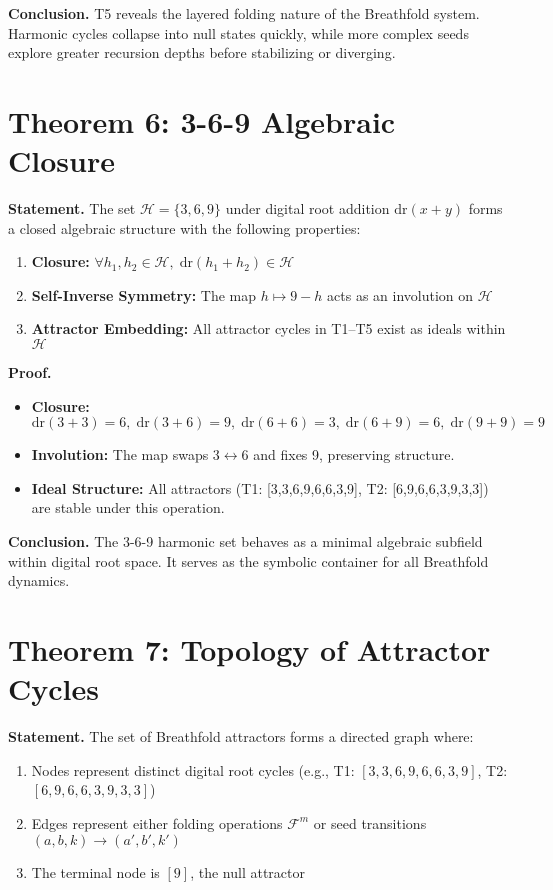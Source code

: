 \documentclass[12pt]{article}
\begin{document}
\textbf{Conclusion.} T5 reveals the layered folding nature of the Breathfold system. Harmonic cycles collapse into null states quickly, while more complex seeds explore greater recursion depths before stabilizing or diverging.

\section*{Theorem 6: 3-6-9 Algebraic Closure}
\textbf{Statement.} The set \( \mathcal{H} = \{3, 6, 9\} \) under digital root addition \( \mathrm{dr}(x + y) \) forms a closed algebraic structure with the following properties:
\begin{enumerate}
  \item \textbf{Closure:} \( \forall h_1, h_2 \in \mathcal{H}, \; \mathrm{dr}(h_1 + h_2) \in \mathcal{H} \)
  \item \textbf{Self-Inverse Symmetry:} The map \( h \mapsto 9 - h \) acts as an involution on \( \mathcal{H} \)
  \item \textbf{Attractor Embedding:} All attractor cycles in T1–T5 exist as ideals within \( \mathcal{H} \)
\end{enumerate}

\textbf{Proof.}
\begin{itemize}
  \item \textbf{Closure:} \( \mathrm{dr}(3+3) = 6, \; \mathrm{dr}(3+6) = 9, \; \mathrm{dr}(6+6) = 3, \; \mathrm{dr}(6+9) = 6, \; \mathrm{dr}(9+9) = 9 \)
  \item \textbf{Involution:} The map swaps \( 3 \leftrightarrow 6 \) and fixes 9, preserving structure.
  \item \textbf{Ideal Structure:} All attractors (T1: [3,3,6,9,6,6,3,9], T2: [6,9,6,6,3,9,3,3]) are stable under this operation.
\end{itemize}

\textbf{Conclusion.} The 3-6-9 harmonic set behaves as a minimal algebraic subfield within digital root space. It serves as the symbolic container for all Breathfold dynamics.

\section*{Theorem 7: Topology of Attractor Cycles}
\textbf{Statement.} The set of Breathfold attractors forms a directed graph where:
\begin{enumerate}
  \item Nodes represent distinct digital root cycles (e.g., T1: \([3,3,6,9,6,6,3,9]\), T2: \([6,9,6,6,3,9,3,3]\))
  \item Edges represent either folding operations \( \mathcal{F}^m \) or seed transitions \( (a, b, k) \rightarrow (a', b', k') \)
  \item The terminal node is \([9]\), the null attractor
\end{enumerate}
\end{document}
